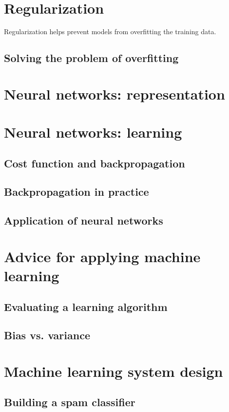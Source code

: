 	\section{Regularization}
	\noindent Regularization helps prevent models from overfitting
	the training data.
	\subsection{Solving the problem of overfitting}

	\section{Neural networks: representation}

	\section{Neural networks: learning}
	\subsection{Cost function and backpropagation}
	\subsection{Backpropagation in practice}
	\subsection{Application of neural networks}


	\section{Advice for applying machine learning}
	\subsection{Evaluating a learning algorithm}
	\subsection{Bias vs. variance}


	\section{Machine learning system design}
	\subsection{Building a spam classifier}
